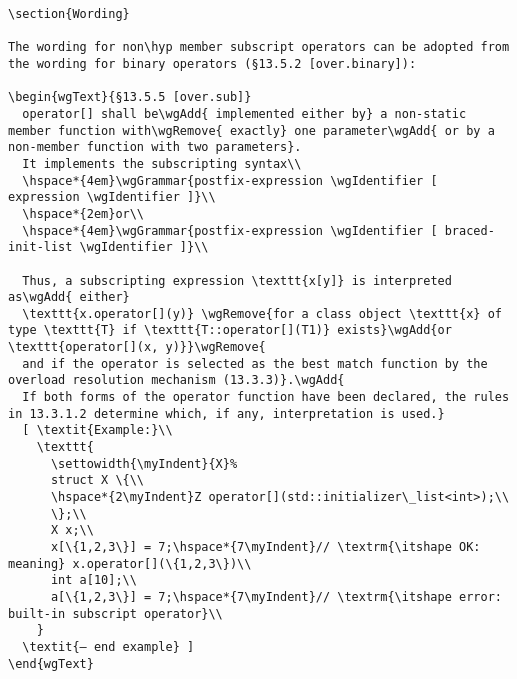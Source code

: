 \begin{lstlisting}
\section{Wording}

The wording for non\hyp member subscript operators can be adopted from the wording for binary operators (§13.5.2 [over.binary]):

\begin{wgText}{§13.5.5 [over.sub]}
  operator[] shall be\wgAdd{ implemented either by} a non-static member function with\wgRemove{ exactly} one parameter\wgAdd{ or by a non-member function with two parameters}.
  It implements the subscripting syntax\\
  \hspace*{4em}\wgGrammar{postfix-expression \wgIdentifier [ expression \wgIdentifier ]}\\
  \hspace*{2em}or\\
  \hspace*{4em}\wgGrammar{postfix-expression \wgIdentifier [ braced-init-list \wgIdentifier ]}\\

  Thus, a subscripting expression \texttt{x[y]} is interpreted as\wgAdd{ either}
  \texttt{x.operator[](y)} \wgRemove{for a class object \texttt{x} of type \texttt{T} if \texttt{T::operator[](T1)} exists}\wgAdd{or \texttt{operator[](x, y)}}\wgRemove{
  and if the operator is selected as the best match function by the overload resolution mechanism (13.3.3)}.\wgAdd{
  If both forms of the operator function have been declared, the rules in 13.3.1.2 determine which, if any, interpretation is used.}
  [ \textit{Example:}\\
    \texttt{
      \settowidth{\myIndent}{X}%
      struct X \{\\
      \hspace*{2\myIndent}Z operator[](std::initializer\_list<int>);\\
      \};\\
      X x;\\
      x[\{1,2,3\}] = 7;\hspace*{7\myIndent}// \textrm{\itshape OK: meaning} x.operator[](\{1,2,3\})\\
      int a[10];\\
      a[\{1,2,3\}] = 7;\hspace*{7\myIndent}// \textrm{\itshape error: built-in subscript operator}\\
    }
  \textit{— end example} ]
\end{wgText}


\end{lstlisting}
